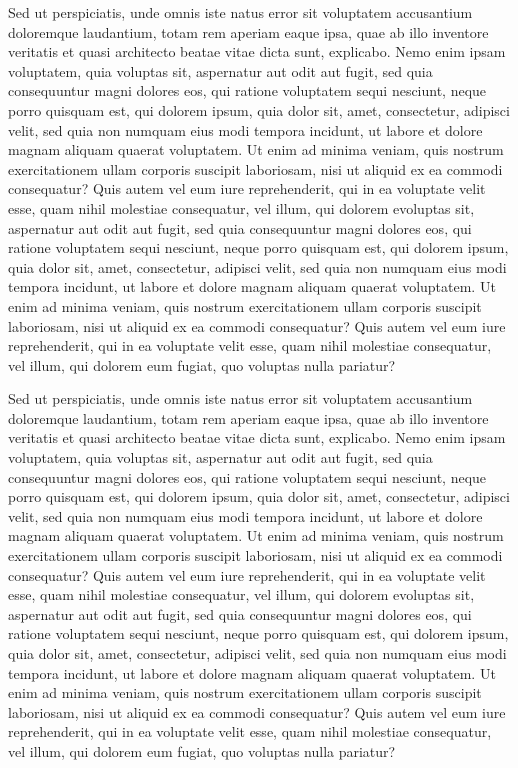 \documentclass{mgr}
\begin{document}
Sed ut perspiciatis, unde omnis iste natus error sit voluptatem accusantium doloremque laudantium, totam rem aperiam eaque ipsa, quae ab illo inventore veritatis et quasi architecto beatae vitae dicta sunt, explicabo. Nemo enim ipsam voluptatem, quia voluptas sit, aspernatur aut odit aut fugit, sed quia consequuntur magni dolores eos, qui ratione voluptatem sequi nesciunt, neque porro quisquam est, qui dolorem ipsum, quia dolor sit, amet, consectetur, adipisci velit, sed quia non numquam eius modi tempora incidunt, ut labore et dolore magnam aliquam quaerat voluptatem. Ut enim ad minima veniam, quis nostrum exercitationem ullam corporis suscipit laboriosam, nisi ut aliquid ex ea commodi consequatur? Quis autem vel eum iure reprehenderit, qui in ea voluptate velit esse, quam nihil molestiae consequatur, vel illum, qui dolorem evoluptas sit, aspernatur aut odit aut fugit, sed quia consequuntur magni dolores eos, qui ratione voluptatem sequi nesciunt, neque porro quisquam est, qui dolorem ipsum, quia dolor sit, amet, consectetur, adipisci velit, sed quia non numquam eius modi tempora incidunt, ut labore et dolore magnam aliquam quaerat voluptatem. Ut enim ad minima veniam, quis nostrum exercitationem ullam corporis suscipit laboriosam, nisi ut aliquid ex ea commodi consequatur? Quis autem vel eum iure reprehenderit, qui in ea voluptate velit esse, quam nihil molestiae consequatur, vel illum, qui dolorem eum fugiat, quo voluptas nulla pariatur?

Sed ut perspiciatis, unde omnis iste natus error sit voluptatem accusantium doloremque laudantium, totam rem aperiam eaque ipsa, quae ab illo inventore veritatis et quasi architecto beatae vitae dicta sunt, explicabo. Nemo enim ipsam voluptatem, quia voluptas sit, aspernatur aut odit aut fugit, sed quia consequuntur magni dolores eos, qui ratione voluptatem sequi nesciunt, neque porro quisquam est, qui dolorem ipsum, quia dolor sit, amet, consectetur, adipisci velit, sed quia non numquam eius modi tempora incidunt, ut labore et dolore magnam aliquam quaerat voluptatem. Ut enim ad minima veniam, quis nostrum exercitationem ullam corporis suscipit laboriosam, nisi ut aliquid ex ea commodi consequatur? Quis autem vel eum iure reprehenderit, qui in ea voluptate velit esse, quam nihil molestiae consequatur, vel illum, qui dolorem evoluptas sit, aspernatur aut odit aut fugit, sed quia consequuntur magni dolores eos, qui ratione voluptatem sequi nesciunt, neque porro quisquam est, qui dolorem ipsum, quia dolor sit, amet, consectetur, adipisci velit, sed quia non numquam eius modi tempora incidunt, ut labore et dolore magnam aliquam quaerat voluptatem. Ut enim ad minima veniam, quis nostrum exercitationem ullam corporis suscipit laboriosam, nisi ut aliquid ex ea commodi consequatur? Quis autem vel eum iure reprehenderit, qui in ea voluptate velit esse, quam nihil molestiae consequatur, vel illum, qui dolorem eum fugiat, quo voluptas nulla pariatur?
\end{document}

